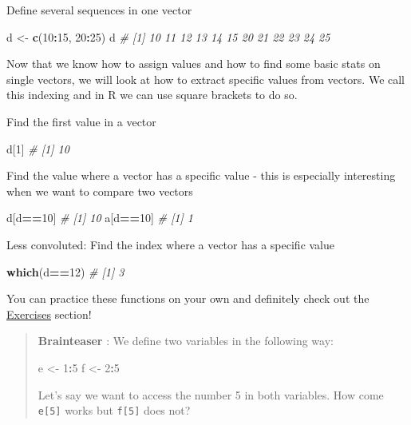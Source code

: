 \documentclass[
]{book}
\newenvironment{Shaded}{\begin{snugshade}}{\end{snugshade}}
\newcommand{\CommentTok}[1]{\textcolor[rgb]{0.56,0.35,0.01}{\textit{#1}}}
\newcommand{\DecValTok}[1]{\textcolor[rgb]{0.00,0.00,0.81}{#1}}
\newcommand{\FunctionTok}[1]{\textcolor[rgb]{0.13,0.29,0.53}{\textbf{#1}}}
\newcommand{\NormalTok}[1]{#1}
\newcommand{\OtherTok}[1]{\textcolor[rgb]{0.56,0.35,0.01}{#1}}
\newcommand{\SpecialCharTok}[1]{\textcolor[rgb]{0.81,0.36,0.00}{\textbf{#1}}}
\begin{document}
Define several sequences in one vector

\begin{Shaded}
\begin{Highlighting}[]
\NormalTok{d }\OtherTok{\textless{}{-}} \FunctionTok{c}\NormalTok{(}\DecValTok{10}\SpecialCharTok{:}\DecValTok{15}\NormalTok{, }\DecValTok{20}\SpecialCharTok{:}\DecValTok{25}\NormalTok{)}
\NormalTok{d}
\CommentTok{\#  [1] 10 11 12 13 14 15 20 21 22 23 24 25}
\end{Highlighting}
\end{Shaded}

Now that we know how to assign values and how to find some basic stats on single vectors, we will look at how to extract specific values from vectors.
We call this indexing and in R we can use square brackets to do so.

Find the first value in a vector

\begin{Shaded}
\begin{Highlighting}[]
\NormalTok{d[}\DecValTok{1}\NormalTok{]}
\CommentTok{\# [1] 10}
\end{Highlighting}
\end{Shaded}

Find the value where a vector has a specific value - this is especially interesting when we want to compare two vectors

\begin{Shaded}
\begin{Highlighting}[]
\NormalTok{d[d}\SpecialCharTok{==}\DecValTok{10}\NormalTok{]}
\CommentTok{\# [1] 10}
\NormalTok{a[d}\SpecialCharTok{==}\DecValTok{10}\NormalTok{]}
\CommentTok{\# [1] 1}
\end{Highlighting}
\end{Shaded}

Less convoluted: Find the index where a vector has a specific value

\begin{Shaded}
\begin{Highlighting}[]
\FunctionTok{which}\NormalTok{(d}\SpecialCharTok{==}\DecValTok{12}\NormalTok{)}
\CommentTok{\# [1] 3}
\end{Highlighting}
\end{Shaded}

You can practice these functions on your own and definitely check out the \hyperref[exercises]{Exercises} section!

\begin{quote}
\textbf{Brainteaser} :
We define two variables in the following way:

\begin{Shaded}
\begin{Highlighting}[]
\NormalTok{e }\OtherTok{\textless{}{-}} \DecValTok{1}\SpecialCharTok{:}\DecValTok{5}
\NormalTok{f }\OtherTok{\textless{}{-}} \DecValTok{2}\SpecialCharTok{:}\DecValTok{5}
\end{Highlighting}
\end{Shaded}

Let's say we want to access the number 5 in both variables.
How come \texttt{e{[}5{]}} works but \texttt{f{[}5{]}} does not?
\end{quote}
\end{document}
